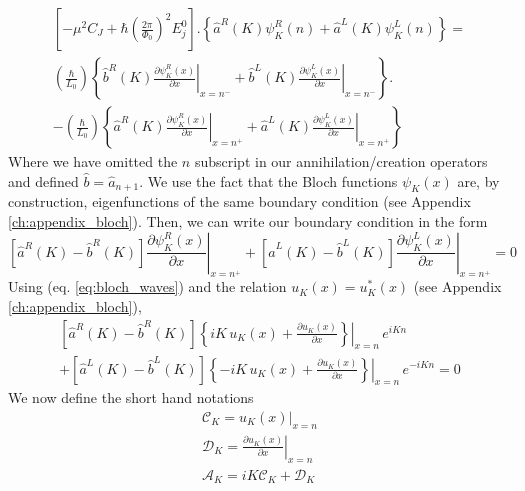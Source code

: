 \begin{equation}\label{eq:BC_static_1}
\begin{split}
    \left[-\mu^2 C_{J}+\hbar\left(\frac{2 \pi}{\Phi_{0}}\right)^{2} E_{j}^0\right].
    \left\lbrace\hat{a}^R(K) \psi^R_K(n) + \hat{a}^L(K) \psi^L_K(n) \right\rbrace =
    \\[2mm]
       \left(\frac{\hbar}{L_0}\right) 
    \left\lbrace\hat{b}^R(K) \left.\frac{\partial \psi^R_K(x)}{\partial x}\right|_{x=n^-} +\hat{b}^L(K) \left.\frac{\partial \psi^L_K(x)}{\partial x}\right|_{x=n^-}\right\rbrace.
    \\[2mm]
    -
    \left(\frac{\hbar}{L_0}\right) 
    \left\lbrace\hat{a}^R(K) \left.\frac{\partial \psi^R_K(x)}{\partial x}\right|_{x=n^+} +\hat{a}^L(K) \left.\frac{\partial \psi^L_K(x)}{\partial x}\right|_{x=n^+} \right\rbrace
\end{split}
\end{equation}
%
Where we have omitted the $n$ subscript in our annihilation/creation operators and defined $\hat{b} = \hat{a}_{n+1}$.
We use the fact that the Bloch functions $\psi_K(x)$ are, by construction, eigenfunctions of the same boundary condition (see Appendix \ref{ch:appendix_bloch}). Then, we can write our boundary condition in the form
%
\begin{equation}
    \left[\hat{a}^R(K) - \hat{b}^R(K)\right]\left.\frac{\partial \psi^R_K(x)}{\partial x}\right|_{x=n^+}
    +
    \left[\hat{a}^L(K) - \hat{b}^L(K)\right]\left.\frac{\partial \psi^L_K(x)}{\partial x}\right|_{x=n^+} = 0 
\end{equation}
%
Using (eq. \ref{eq:bloch_waves}) and the relation $u_K(x) = u^*_K(x)$ (see Appendix \ref{ch:appendix_bloch}),
%
\begin{equation}\label{eq:BC_static_2}
\begin{split}
    \left[\hat{a}^R(K) - \hat{b}^R(K)\right]\left.\left\lbrace i K \, u_K(x) + \frac{\partial u_K(x)}{\partial x}\right\rbrace\right|_{x=n}\,e^{i K n}
    \\[2mm]
    +
    \left[\hat{a}^L(K) - \hat{b}^L(K)\right]\left.\left\lbrace-i K\, u_K(x) + \frac{\partial u_K(x)}{\partial x}\right\rbrace\right|_{x=n}\,e^{-i K n} = 0 
\end{split}
\end{equation}
%
We now define the short hand notations
%
\begin{gather}\label{eq:caligraphics}
    \mathcal{C}_K = \left.u_K(x)\right|_{x=n}\\
    \mathcal{D}_K = \left.\frac{\partial u_K(x)}{\partial x}\right|_{x=n}\\
    \mathcal{A}_K = iK\mathcal{C}_K + \mathcal{D}_K
\end{gather}
